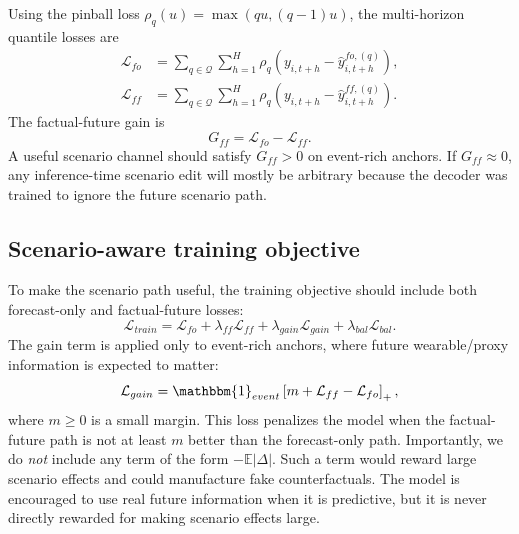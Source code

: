 Using the pinball loss $\rho_q(u)=\max(q u,(q-1)u)$, the multi-horizon quantile losses are
\begin{align}
    \mathcal{L}_{fo}
    &= \sum_{q \in \mathcal{Q}} \sum_{h=1}^{H}
    \rho_q\left(y_{i,t+h} - \hat{y}^{fo,(q)}_{i,t+h}\right), \\
    \mathcal{L}_{ff}
    &= \sum_{q \in \mathcal{Q}} \sum_{h=1}^{H}
    \rho_q\left(y_{i,t+h} - \hat{y}^{ff,(q)}_{i,t+h}\right).
\end{align}
The factual-future gain is
\begin{equation}
    G_{ff} = \mathcal{L}_{fo} - \mathcal{L}_{ff}.
    \label{eq:factual_gain}
\end{equation}
A useful scenario channel should satisfy $G_{ff}>0$ on event-rich anchors. If $G_{ff}\approx 0$, any inference-time scenario edit will mostly be arbitrary because the decoder was trained to ignore the future scenario path.

\subsection{Scenario-aware training objective}
\label{subsec:cf_training_objective}

To make the scenario path useful, the training objective should include both forecast-only and factual-future losses:
\begin{equation}
    \mathcal{L}_{train}
    = \mathcal{L}_{fo}
    + \lambda_{ff}\mathcal{L}_{ff}
    + \lambda_{gain}\mathcal{L}_{gain}
    + \lambda_{bal}\mathcal{L}_{bal}.
    \label{eq:scenario_train_loss}
\end{equation}
The gain term is applied only to event-rich anchors, where future wearable/proxy information is expected to matter:
\begin{equation}
    \mathcal{L}_{gain}
    = \mathbbm{1}_{event}
    \left[m + \mathcal{L}_{ff} - \mathcal{L}_{fo}\right]_+,
    \label{eq:gain_hinge}
\end{equation}
where $m \geq 0$ is a small margin. This loss penalizes the model when the factual-future path is not at least $m$ better than the forecast-only path. Importantly, we do \emph{not} include any term of the form $-\mathbb{E}|\Delta|$. Such a term would reward large scenario effects and could manufacture fake counterfactuals. The model is encouraged to use real future information when it is predictive, but it is never directly rewarded for making scenario effects large.

